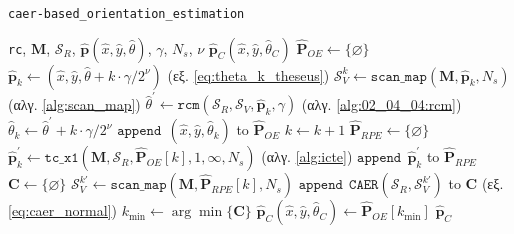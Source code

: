 \begin{algorithm}[!h]
  \caption{\texttt{caer-based\_orientation\_estimation}}
  \begin{spacing}{1.5}
  \begin{algorithmic}[1]
    \REQUIRE \texttt{rc}, $\bm{M}$, $\mathcal{S}_R$, $\hat{\bm{p}}(\hat{x}, \hat{y}, \hat{\theta})$, $\gamma$, $N_s$, $\nu$
    \ENSURE $\hat{\bm{p}}_C(\hat{x}, \hat{y}, \hat{\theta}_C)$
    \STATE {}$\hat{\bm{P}}_{OE} \leftarrow \{\varnothing\}$
      \STATE $\hat{\bm{p}}_k \leftarrow (\hat{x}, \hat{y}, \hat{\theta} + k \cdot \gamma/2^\nu)$ \hfill (εξ. \ref{eq:theta_k_theseus})
      \STATE $\mathcal{S}_V^k \leftarrow \texttt{scan\_map}(\bm{M}, \hat{\bm{p}}_k, N_s)$ \hfill (αλγ. \ref{alg:scan_map})
      \STATE $\hat{\theta}^\prime \leftarrow \texttt{rcm}(\mathcal{S}_R, \mathcal{S}_V, \hat{\bm{p}}_k, \gamma)$ \hfill (αλγ. \ref{alg:02_04_04:rcm})
      \STATE $\hat{\theta}_k \leftarrow \hat{\theta}^\prime + k \cdot \gamma/2^\nu$
      \STATE $\texttt{append} \ \ (\hat{x}, \hat{y}, \hat{\theta}_k)$ to $\hat{\bm{P}}_{OE}$
      \STATE $k \leftarrow k + 1$
    \ENDFOR {}
    \STATE {}$\hat{\bm{P}}_{RPE} \leftarrow \{\varnothing\}$
      \STATE $\hat{\bm{p}}_k^\prime \leftarrow \texttt{tc\_x1}(\bm{M}, \mathcal{S}_R, \hat{\bm{P}}_{OE}[k], 1, \infty, N_s)$ \hfill (αλγ. \ref{alg:icte})
      \STATE $\texttt{append} \ \ \hat{\bm{p}}_k^\prime$ to $\hat{\bm{P}}_{RPE}$
    \ENDFOR{}
    \STATE {}$\bm{C} \leftarrow \{\varnothing\}$
      \STATE $\mathcal{S}_V^{k \prime} \leftarrow \texttt{scan\_map}(\bm{M}, \hat{\bm{P}}_{RPE}[k], N_s)$
      \STATE $\texttt{append} \ \ \texttt{CAER}(\mathcal{S}_R, \mathcal{S}_V^{k \prime})$ to $\bm{C}$ \hfill (εξ. \ref{eq:caer_normal})
    \ENDFOR{}
    \STATE $k_{\min} \leftarrow \arg\min \{\bm{C}\}$
    \STATE $\hat{\bm{p}}_C(\hat{x}, \hat{y}, \hat{\theta}_C) \leftarrow \hat{\bm{P}}_{OE}[k_{\min}]$
    \RETURN $\hat{\bm{p}}_C$
  \end{algorithmic}
  \end{spacing}
  \label{alg:02_04_04:rc}
\end{algorithm}


